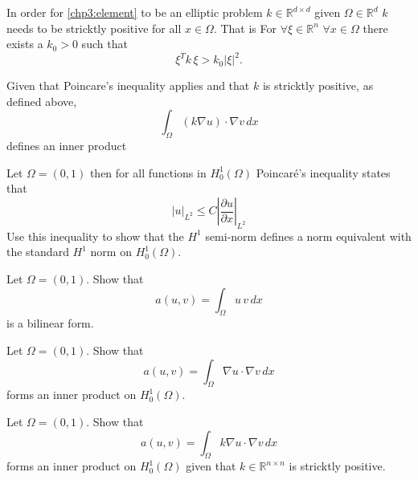 In order for \eqref{chp3:element} to be an elliptic problem $k \in \mathbb{R}^{d\times d}$ given $\Omega\in \mathbb{R}^d$  
$k$ needs to be stricktly positive for all $x\in \Omega$. That is  
For $\forall \xi\in \mathbb{R}^n$ $\forall x \in \Omega$ there exists a $k_0 > 0$ such that 
\[
\xi^T k \, \xi > k_0 |\xi|^2 .   
\]

Given that Poincare's inequality applies and that $k$ is stricktly positive, as defined above, 
\[
\int_\Omega (k \nabla u) \cdot \nabla v \, dx 
\]
defines an inner product 


\begin{exercise}
\label{ex:poincare}

Let $\Omega=(0,1)$ then  
for all functions in $H^1_0(\Omega)$
Poincar\'e's inequality states that
\[
|u|_{L^2} \le C  |\frac{\partial u}{\partial x}|_{L^2}   
\]
Use this inequality to show that the $H^1$ semi-norm defines 
a norm equivalent with the standard $H^1$ norm on $H^1_0(\Omega)$.  
\end{exercise}

\begin{exercise}
\label{ex:bilinear}

Let $\Omega=(0,1)$.  
Show that 
\[  
a(u, v) = \int_\Omega  u \, v \, dx 
\]
is a bilinear form. 
\end{exercise}


\begin{exercise}
\label{ex:poincare2}

Let $\Omega=(0,1)$.  
Show that 
\[  
a(u, v) = \int_\Omega \nabla u \cdot \nabla v \, dx 
\]
forms an inner product on $H^1_0(\Omega)$. 
\end{exercise}

\begin{exercise}
\label{ex:poincare3}

Let $\Omega=(0,1)$.  
Show that 
\[  
a(u, v) = \int_\Omega k \nabla u \cdot \nabla v \, dx 
\]
forms an inner product on $H^1_0(\Omega)$ given that $k \in \mathbb{R}^{n \times n}$ is stricktly positive.  
\end{exercise}



